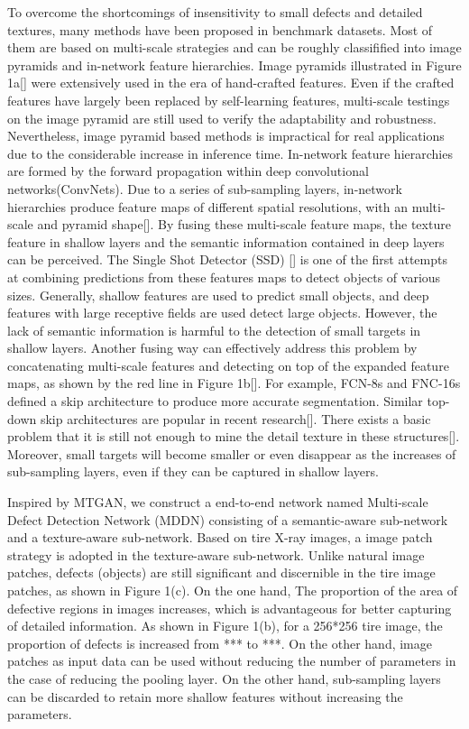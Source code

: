 \documentclass{article}
\begin{document}
To overcome the shortcomings of insensitivity to small defects and detailed textures, many methods have been proposed in benchmark datasets. Most of them are based on multi-scale strategies and can be roughly classifified into image pyramids and in-network feature hierarchies. Image pyramids illustrated in Figure 1a[]  were extensively used in the era of hand-crafted features\cite{lowe2004distinctive,dalal2005histograms}. Even if the crafted features have largely been replaced by self-learning features, multi-scale testings on the image pyramid are still used to verify the adaptability and robustness. Nevertheless, image pyramid based methods is impractical for real applications due to the considerable increase in inference time. In-network feature hierarchies are formed by the forward propagation within deep convolutional networks(ConvNets). Due to a series of sub-sampling layers, in-network hierarchies produce feature maps of different spatial resolutions, with an multi-scale and pyramid shape[]. By fusing these multi-scale feature maps, the texture feature in shallow layers and the semantic information contained in deep layers can be perceived. The Single Shot Detector (SSD) [] is one of the first attempts at combining predictions from these features maps to detect objects of various sizes. Generally, shallow features are used to predict small objects, and deep features with large receptive fields are used detect large objects. However, the lack of semantic information is harmful to the detection of small targets in shallow layers. Another fusing way can effectively address this problem by concatenating multi-scale features and detecting on top of the expanded feature maps, as shown by the red line in Figure 1b[]. For example, FCN-8s and FNC-16s defined a skip architecture to produce more accurate segmentation. Similar top-down skip architectures are popular in recent research[]. There exists a basic problem that it is still not enough to mine the detail texture in these structures[]. Moreover, small targets will become smaller or even disappear as the increases of sub-sampling layers, even if they can be captured in shallow layers.

Inspired by MTGAN, we construct a end-to-end network named Multi-scale Defect Detection Network (MDDN) consisting of a semantic-aware sub-network and a texture-aware sub-network. Based on tire X-ray images, a image patch strategy is adopted in the texture-aware sub-network. Unlike natural image patches, defects (objects) are still significant and discernible in the tire image patches, as shown in Figure 1(c). On the one hand, The proportion of the area of defective regions in images increases, which is advantageous for better capturing of detailed information. As shown in Figure 1(b), for a 256*256 tire image, the proportion of defects is increased from *** to ***. On the other hand, image patches as input data can be used without reducing the number of parameters in the case of reducing the pooling layer. On the other hand, sub-sampling layers can be discarded to retain more shallow features without increasing the parameters.
\end{document}
